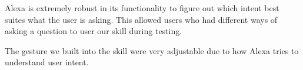 Alexa is extremely robust in its functionality to figure out which intent best suites what the user is asking. This allowed users who had different ways of asking a question to user our skill during testing.

The gesture we built into the skill were very adjustable due to how Alexa tries to understand user intent.
